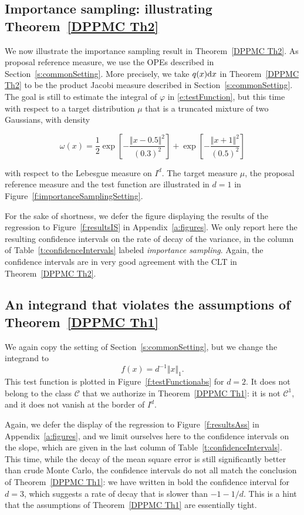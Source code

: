 \documentclass[a4paper,11pt]{article}
\numberwithin{equation}{section}
\theoremstyle{definition}
\newcommand{\rev}[1]{#1}
\renewcommand{\phi}{\varphi}
\renewcommand{\d}{ {\rm d}}
\begin{document}
\subsection{Importance sampling: illustrating Theorem~\ref{DPPMC Th2}}
\rev{
We now illustrate the importance sampling result in Theorem~\ref{DPPMC Th2}. As proposal reference measure, we use the OPEs described in Section~\ref{s:commonSetting}. More precisely, we take $q(x)\d x$ in Theorem~\ref{DPPMC Th2} to be the product Jacobi measure described in Section~\ref{s:commonSetting}. The goal is still to estimate the integral of $\phi$ in \eqref{e:testFunction}, but this time with respect to a target distribution $\mu$ that is a truncated mixture of two Gaussians, with density
}
\rev{
$$ \omega(x) = \frac12 \exp\left[-\frac{\Vert x-0.5\Vert^2}{(0.3)^2}\right] + \exp\left[-\frac{\Vert x+1\Vert^2}{(0.5)^2}\right]$$
}
\rev{with respect to the Lebesgue measure on $I^d$.
The target measure $\mu$, the proposal reference measure and the test function are illustrated in $d=1$ in Figure~\ref{f:importanceSamplingSetting}.
}

\rev{
For the sake of shortness, we defer the figure displaying the results of the regression to Figure~\ref{f:resultsIS} in Appendix~\ref{a:figures}. We only report here the resulting confidence intervals on the rate of decay of the variance, in the column of Table~\ref{t:confidenceIntervals} labeled \emph{importance sampling}. Again, the confidence intervals are in very good agreement with the CLT in Theorem~\ref{DPPMC Th2}.
}

\subsection{An integrand that violates the assumptions of Theorem~\ref{DPPMC Th1}}
\label{s:ass}
\rev{We again copy the setting of Section~\ref{s:commonSetting}, but we change the integrand to
$$ f(x) = d^{-1}\Vert x\Vert_1.$$
This test function is plotted in Figure~\ref{f:testFunctionabs} for $d=2$. It does not belong to the class $\mathscr{C}$ that we authorize in Theorem~\ref{DPPMC Th1}: it is not $\mathscr C^1$, and it does not vanish at the border of $I^d$.
}
\rev{
Again, we defer the display of the regression to Figure~\ref{f:resultsAss} in Appendix~\ref{a:figures}, and we limit ourselves here to the confidence intervals on the slope, which are given in the last column of Table~\ref{t:confidenceIntervals}. This time, while the decay of the mean square error is still significantly better than crude Monte Carlo, the confidence intervals do not all match the conclusion of Theorem~\ref{DPPMC Th1}: we have written in bold the confidence interval for $d=3$, which suggests a rate of decay that is slower than $-1-1/d$. This is a hint that the assumptions of Theorem~\ref{DPPMC Th1} are essentially tight.
}
\end{document}
